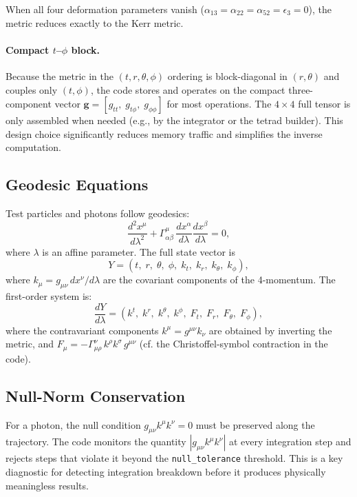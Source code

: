 \documentclass[11pt,twoside]{article}
\begin{document}
When all four deformation parameters vanish ($\alpha_{13} = \alpha_{22} = \alpha_{52} = \epsilon_3 = 0$),
the metric reduces exactly to the Kerr metric.

\paragraph{Compact $t$--$\phi$ block.}
Because the metric in the $(t, r, \theta, \phi)$ ordering is block-diagonal in
$(r, \theta)$ and couples only $(t, \phi)$, the code stores and operates on the
compact three-component vector $\mathbf{g} = [g_{tt},\; g_{t\phi},\; g_{\phi\phi}]$
for most operations. The $4\times4$ full tensor is only assembled when needed
(e.g., by the integrator or the tetrad builder). This design choice
significantly reduces memory traffic and simplifies the inverse computation.

\subsection{Geodesic Equations}
Test particles and photons follow geodesics:
\begin{equation}
\frac{d^2 x^\mu}{d\lambda^2} + \Gamma^\mu_{\alpha\beta}\,\frac{dx^\alpha}{d\lambda}\frac{dx^\beta}{d\lambda} = 0,
\end{equation}
where $\lambda$ is an affine parameter. The full state vector is
\begin{equation}
Y = (t,\; r,\; \theta,\; \phi,\; k_t,\; k_r,\; k_\theta,\; k_\phi),
\end{equation}
where $k_\mu = g_{\mu\nu}\,dx^\nu/d\lambda$ are the covariant components of the
4-momentum. The first-order system is:
\begin{equation}
\frac{dY}{d\lambda} = (k^t,\; k^r,\; k^\theta,\; k^\phi,\; F_t,\; F_r,\; F_\theta,\; F_\phi),
\end{equation}
where the contravariant components $k^\mu = g^{\mu\nu} k_\nu$ are obtained by
inverting the metric, and $F_\mu = -\Gamma^\nu_{\mu\rho}\,k^\rho k^\sigma\,g^{\mu\nu}$
(cf. the Christoffel-symbol contraction in the code).

\subsection{Null-Norm Conservation}
For a photon, the null condition $g_{\mu\nu}k^\mu k^\nu = 0$ must be preserved
along the trajectory. The code monitors the quantity $|g_{\mu\nu}k^\mu k^\nu|$
at every integration step and rejects steps that violate it beyond the
\texttt{null\_tolerance} threshold. This is a key diagnostic for detecting
integration breakdown before it produces physically meaningless results.
\end{document}
